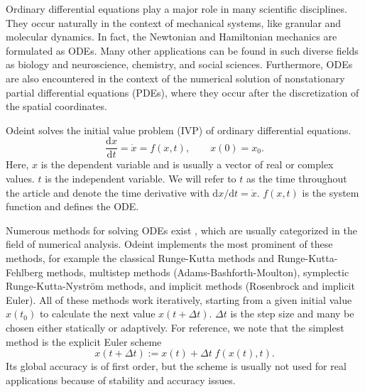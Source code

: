 \documentclass[final]{siamltex}
\newcommand {\de} {\mbox{d}}
\begin{document}
Ordinary differential equations play a major role in many scientific
disciplines. They occur naturally in the context of mechanical
systems, like granular and molecular dynamics. In fact, the Newtonian
and Hamiltonian mechanics are formulated as ODEs.
Many other applications can be found in such diverse
fields as biology and neuroscience, chemistry, and social sciences. %
Furthermore, ODEs are also encountered in the context of the numerical solution of nonstationary partial
differential equations (PDEs), where they occur after the discretization of the spatial coordinates.

Odeint solves %
the initial value problem (IVP) of ordinary differential equations.
\begin{equation}
\frac{\de x}{\de t } = \dot{x} = f(x , t), \quad \quad x(0) =
x_0.
\label{eq:ode}
\end{equation}
Here, $x$ is the dependent variable and is usually a vector of real or complex values.
$t$ is the independent variable. We will refer to $t$ as the time throughout the article and 
denote the time derivative with $\de x / \de t = \dot{x}$. $f(x,t)$ is
the system function and defines the ODE.

Numerous methods for solving ODEs exist \cite{HairerSolvingODEI,
  HairerSolvingODEII, HairerGeometricNumericalIntegration2006}, %
which are usually categorized in the field of numerical analysis. 
Odeint
implements the most prominent of these methods, for example the
classical Runge-Kutta methods and Runge-Kutta-Fehlberg methods,
multistep methods (Adams-Bashforth-Moulton), symplectic
Runge-Kutta-Nystr\"om methods, and implicit methods (Rosenbrock and
implicit Euler). All of these methods work iteratively, starting
from a given initial value $x(t_0)$ to calculate the next value
$x(t+\Delta t)$. 
$\Delta t$ is the step size and many be chosen either statically or adaptively.
For reference, we note that the simplest method is the explicit Euler scheme
\begin{equation}
x\left(t+\Delta t\right) := x(t) + \Delta t \; f(x(t),t) .
\label{eq:euler}
\end{equation}
Its global accuracy is of first order, but the scheme is usually not
used for real applications because of stability and accuracy issues.
\end{document}
